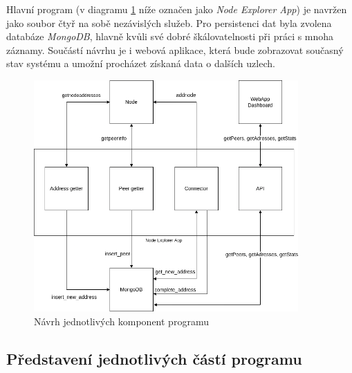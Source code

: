 \documentclass[12pt]{article}
\begin{document}
Hlavní program (v diagramu \ref{fig:navrh} níže označen jako \textit{Node Explorer App}) je navržen jako soubor čtyř na sobě nezávislých služeb. Pro persistenci dat byla zvolena databáze \textit{MongoDB}, hlavně kvůli své dobré škálovatelnosti při práci s mnoha záznamy. Součástí návrhu je i webová aplikace, která bude zobrazovat současný stav systému a umožní procházet získaná data o dalších uzlech.

\begin{figure}[ht]
	\centering
	\includegraphics[width=0.90\textwidth]{img/components.png}
	\caption{Návrh jednotlivých komponent programu}
	\label{fig:navrh}
\end{figure}

\subsection{Představení jednotlivých částí programu}
\end{document}
